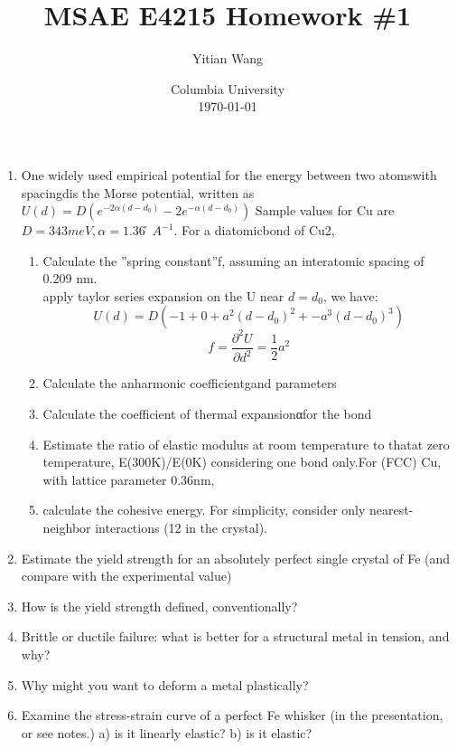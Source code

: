 \documentclass{article}
\title{MSAE E4215 Homework \#1}
\author{Yitian Wang}
\date{Columbia University \\ \today}
\begin{document}
\maketitle
\begin{enumerate}
\item One widely used empirical potential for the energy between two atomswith spacingdis the Morse potential, 
written as
$U(d) =D(e^{-2α(d - d_0)} - 2e^{ - α(d - d_0)})$
Sample values for Cu are$D= 343 meV,α= 1.36 ̊A^{−1}$.  
For a diatomicbond of Cu2,

\begin{enumerate}[label=(\alph*)]
\item Calculate the ”spring constant”f, assuming an interatomic spacing of 0.209 nm.\\
apply taylor series expansion on the U near $d=d_0$, we have:
$$U(d)=D(-1 + 0 + a^2(d-d_0)^2 + {-a}^3(d-d_0)^3) $$
$$f=\frac{\partial^2 U}{\partial d^2}=\frac{1}{2}a^2$$

\item Calculate the anharmonic coefficientgand parameters
\item Calculate the coefficient of thermal expansionαfor the bond
\item Estimate the ratio of elastic modulus at room temperature to thatat zero temperature,
E(300K)/E(0K) considering one bond only.For (FCC) Cu, 
with lattice parameter 0.36nm,
\item calculate the cohesive energy. For simplicity, consider only nearest-neighbor interactions (12 in the crystal).

\end{enumerate}


\item Estimate the yield strength for an absolutely perfect single crystal of Fe 
(and compare with the experimental value)

\item How is the yield strength defined, conventionally? 

\item Brittle or ductile failure: what is better for a structural metal in tension, 
and why?

\item Why might you want to deform a metal plastically? 

\item Examine the stress-strain curve of a perfect Fe whisker (in the presentation, or see notes.)  
a) is it linearly elastic?  b) is it elastic? 


\end{enumerate}
\end{document}
